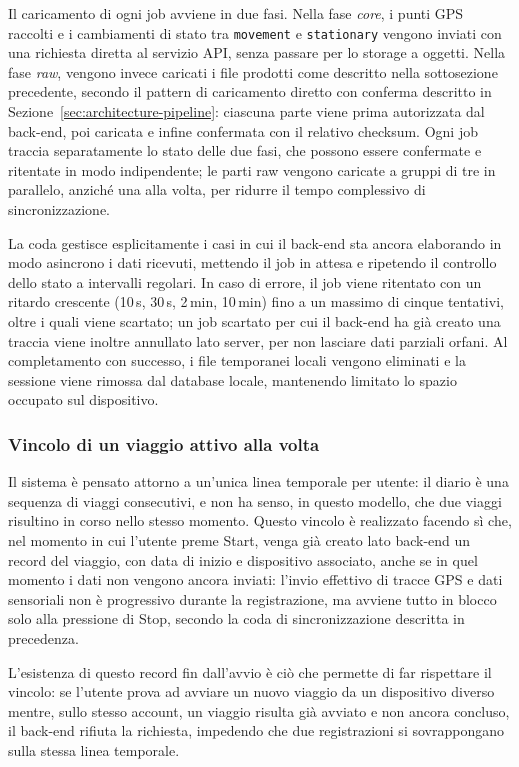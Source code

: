 \documentclass[conference]{IEEEtran}
\begin{document}
Il caricamento di ogni job avviene in due fasi. Nella fase
\emph{core}, i punti GPS raccolti e i cambiamenti di stato tra
\texttt{movement} e \texttt{stationary} vengono inviati con una
richiesta diretta al servizio API, senza passare per lo storage a
oggetti. Nella fase \emph{raw}, vengono invece caricati i file
prodotti come descritto nella sottosezione precedente, secondo il
pattern di caricamento diretto con conferma descritto in
Sezione~\ref{sec:architecture-pipeline}: ciascuna parte viene prima
autorizzata dal back-end, poi caricata e infine confermata con il
relativo checksum. Ogni job traccia separatamente lo stato delle due
fasi, che possono essere confermate e ritentate in modo indipendente;
le parti raw vengono caricate a gruppi di tre in parallelo, anziché
una alla volta, per ridurre il tempo complessivo di sincronizzazione.

La coda gestisce esplicitamente i casi in cui il back-end sta ancora
elaborando in modo asincrono i dati ricevuti, mettendo il job in attesa
e ripetendo il controllo dello stato a intervalli regolari. In caso di
errore, il job viene ritentato con un ritardo crescente (10\,s, 30\,s,
2\,min, 10\,min) fino a un massimo di cinque tentativi, oltre i quali
viene scartato; un job scartato per cui il back-end ha già creato una
traccia viene inoltre annullato lato server, per non lasciare dati
parziali orfani. Al completamento con successo, i file temporanei
locali vengono eliminati e la sessione viene rimossa dal database
locale, mantenendo limitato lo spazio occupato sul dispositivo.

\subsubsection{Vincolo di un viaggio attivo alla volta}

Il sistema è pensato attorno a un'unica linea temporale per utente: il
diario è una sequenza di viaggi consecutivi, e non ha senso, in questo
modello, che due viaggi risultino in corso nello stesso momento. Questo
vincolo è realizzato facendo sì che, nel momento in cui l'utente preme
Start, venga già creato lato back-end un record del viaggio, con
data di inizio e dispositivo associato, anche se in quel momento i
dati non vengono ancora inviati: l'invio effettivo di tracce GPS e
dati sensoriali non è progressivo durante la registrazione, ma avviene
tutto in blocco solo alla pressione di Stop, secondo la coda di
sincronizzazione descritta in precedenza.

L'esistenza di questo record fin dall'avvio è ciò che permette di far
rispettare il vincolo: se l'utente prova ad avviare un nuovo viaggio da
un dispositivo diverso mentre, sullo stesso account, un viaggio
risulta già avviato e non ancora concluso, il back-end rifiuta la
richiesta, impedendo che due registrazioni si
sovrappongano sulla stessa linea temporale.
\end{document}
